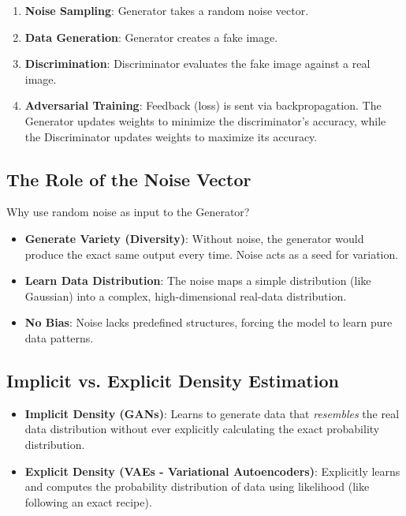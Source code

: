 \documentclass[11pt,a4paper]{article}
\begin{document}
\begin{tcolorbox}[colback=blue!5!white,colframe=blue!75!black,title=\textbf{Training Loop (Min-Max Loss)}]
\begin{enumerate}
    \item \textbf{Noise Sampling}: Generator takes a random noise vector.
    \item \textbf{Data Generation}: Generator creates a fake image.
    \item \textbf{Discrimination}: Discriminator evaluates the fake image against a real image.
    \item \textbf{Adversarial Training}: Feedback (loss) is sent via backpropagation. The Generator updates weights to minimize the discriminator's accuracy, while the Discriminator updates weights to maximize its accuracy.
\end{enumerate}
\end{tcolorbox}

\subsection{The Role of the Noise Vector}
Why use random noise as input to the Generator?
\begin{itemize}
    \item \textbf{Generate Variety (Diversity)}: Without noise, the generator would produce the exact same output every time. Noise acts as a seed for variation.
    \item \textbf{Learn Data Distribution}: The noise maps a simple distribution (like Gaussian) into a complex, high-dimensional real-data distribution.
    \item \textbf{No Bias}: Noise lacks predefined structures, forcing the model to learn pure data patterns.
\end{itemize}

\subsection{Implicit vs. Explicit Density Estimation}
\begin{itemize}
    \item \textbf{Implicit Density (GANs)}: Learns to generate data that \textit{resembles} the real data distribution without ever explicitly calculating the exact probability distribution.
    \item \textbf{Explicit Density (VAEs - Variational Autoencoders)}: Explicitly learns and computes the probability distribution of data using likelihood (like following an exact recipe).
\end{itemize}
\end{document}
